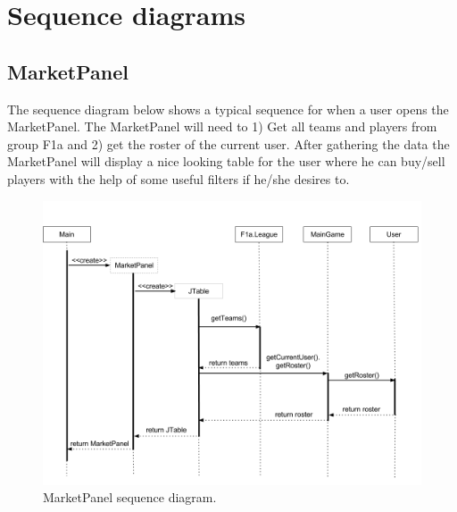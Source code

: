\documentclass{article}
\begin{document}
\newpage
\section{Sequence diagrams}
\subsection{MarketPanel}
The sequence diagram below shows a typical sequence for when a user opens the MarketPanel. The MarketPanel will need to 1) Get all teams and players from group F1a and 2) get the roster of the current user. After gathering the data the MarketPanel will display a nice looking table for the user where he can buy/sell players with the help of some useful filters if he/she desires to.
\begin{figure}[H]
\centering
\includegraphics[width=\textwidth]{img/seq_diagram_1.png}
\caption{MarketPanel sequence diagram.}
\end{figure}

\newpage
\end{document}
